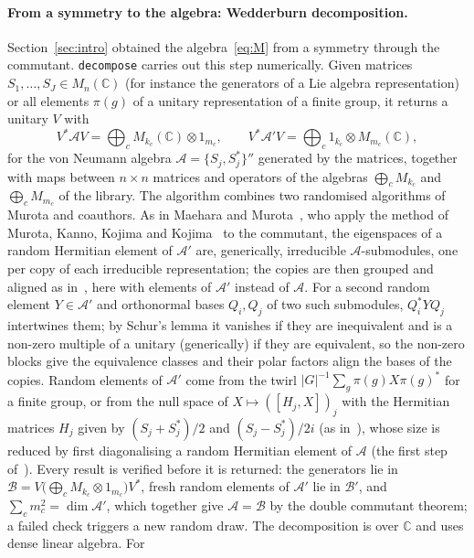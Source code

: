 \documentclass[11pt]{article}
\newcommand{\C}{\mathbb{C}}
\begin{document}
\paragraph{From a symmetry to the algebra: Wedderburn decomposition.} Section~\ref{sec:intro} obtained the
algebra~\eqref{eq:M} from a symmetry through the commutant. \texttt{decompose} carries out this step numerically.
Given matrices $S_1,\dots,S_J\in M_n(\C)$ (for instance the generators of a Lie algebra representation) or all elements
$\pi(g)$ of a unitary representation of a finite group, it returns a unitary $V$ with
\[
  V^*\mathcal AV=\bigoplus_cM_{k_c}(\C)\otimes1_{m_c},\qquad V^*\mathcal A'V=\bigoplus_c1_{k_c}\otimes M_{m_c}(\C),
\]
for the von Neumann algebra $\mathcal A=\{S_j,S_j^*\}''$ generated by the matrices, together with maps between
$n\times n$ matrices and operators of the algebras $\bigoplus_cM_{k_c}$ and $\bigoplus_cM_{m_c}$ of the library. The
algorithm combines two randomised algorithms of Murota and coauthors. As in Maehara and Murota~\cite{maehara2011},
who apply the method of Murota, Kanno, Kojima and Kojima~\cite{murota2010} to the commutant, the
eigenspaces of a random Hermitian element of $\mathcal A'$ are, generically, irreducible $\mathcal A$-submodules, one
per copy of each irreducible representation; the copies are then grouped and aligned as in~\cite[Sec.~4.2]{murota2010},
here with elements of $\mathcal A'$ instead of $\mathcal A$. For a second random element $Y\in\mathcal A'$ and orthonormal bases
$Q_i,Q_j$ of two such submodules, $Q_i^*YQ_j$ intertwines them; by Schur's lemma it vanishes if they are inequivalent
and is a non-zero multiple of a unitary (generically) if they are equivalent, so the non-zero blocks give the
equivalence classes and their polar factors align the bases of the copies. Random elements of $\mathcal A'$ come from
the twirl $|G|^{-1}\sum_g\pi(g)X\pi(g)^*$ for a finite group, or from the null space of $X\mapsto([H_j,X])_j$ with
the Hermitian matrices $H_j$ given by $(S_j+S_j^*)/2$ and $(S_j-S_j^*)/2i$ (as in~\cite{maehara2011}), whose size is
reduced by first diagonalising a random Hermitian element of $\mathcal A$ (the first step of~\cite{murota2010}).
Every result is verified before it is returned: the generators lie in
$\mathcal B=V\bigl(\bigoplus_cM_{k_c}\otimes1_{m_c}\bigr)V^*$, fresh random elements of $\mathcal A'$ lie in
$\mathcal B'$, and $\sum_cm_c^2=\dim\mathcal A'$, which together give $\mathcal A=\mathcal B$ by the double commutant
theorem; a failed check triggers a new random draw. The decomposition is over $\C$ and uses dense linear algebra. For
\end{document}
